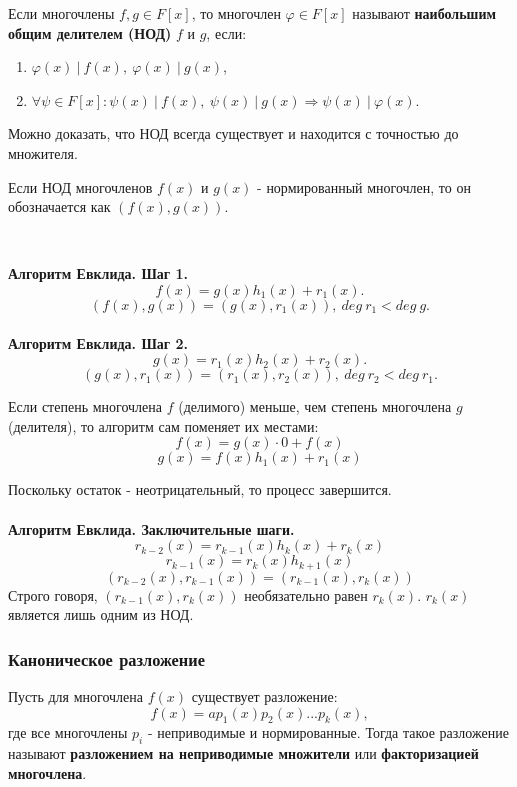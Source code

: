\documentclass[12pt]{article}
\begin{document}
\begin{defn}
Если многочлены $f, g \in F[x]$, то многочлен $\varphi \in F[x]$ называют \textbf{наибольшим общим делителем (НОД)} $f$ и $g$, если:
\begin{enumerate}
\item $\varphi(x)~|~f(x),~ \varphi(x)~|~g(x)$,
\item $\forall \psi \in F[x]: \psi(x)~|~f(x),~ \psi(x)~|~g(x) \Rightarrow \psi(x)~|~\varphi(x)$.
\end{enumerate}
\end{defn}
Можно доказать, что НОД всегда существует и находится с точностью до множителя. 

\begin{defn}
Если НОД многочленов $f(x)$ и $g(x)$  - нормированный многочлен, то он обозначается как $(f(x), g(x))$.
\end{defn}

~\

\noindent\textbf{Алгоритм Евклида. Шаг 1.} $$f(x) = g(x)h_1(x) + r_1(x).$$
$$(f(x),g(x)) = (g(x), r_1(x)),~deg~r_1 < deg~g.$$
\\
\textbf{Алгоритм Евклида. Шаг 2.} $$g(x) = r_1(x)h_2(x) + r_2(x).$$
$$(g(x),r_1(x)) = (r_1(x), r_2(x)),~deg~r_2 < deg~r_1.$$

Если степень многочлена $f$ (делимого) меньше, чем степень многочлена $g$ (делителя), то алгоритм сам поменяет их местами:
$$f(x) = g(x) \cdot 0 + f(x)$$
$$g(x) = f(x)h_1(x) + r_1(x)$$

Поскольку остаток - неотрицательный, то процесс завершится.\\ \\
\textbf{Алгоритм Евклида. Заключительные шаги.}
$$r_{k-2}(x) = r_{k-1}(x)h_k(x) + r_k(x)$$
$$r_{k-1}(x) = r_k(x)h_{k+1}(x)$$
$$(r_{k-2}(x), r_{k-1}(x)) = (r_{k-1}(x), r_{k}(x))$$
\hspace{0.6cm}Строго говоря, $(r_{k-1}(x), r_{k}(x))$ необязательно равен $r_k(x)$. $r_k(x)$ является лишь одним из НОД.

\subsubsection{Каноническое разложение}
\begin{defn}
Пусть для многочлена $f(x)$ существует разложение: $$f(x) = ap_1(x)p_2(x)...p_k(x),$$ где все многочлены $p_i$ - неприводимые и нормированные. Тогда такое разложение называют \textbf{разложением на неприводимые множители} или \textbf{факторизацией многочлена}.
\end{defn}
\end{document}
